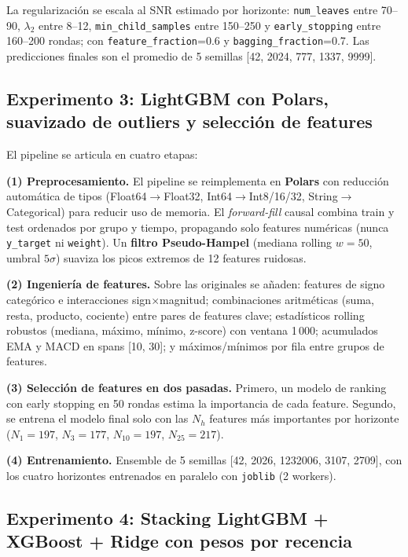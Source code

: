 \documentclass{article}
\begin{document}
La regularización se escala al SNR estimado por horizonte: \texttt{num\_leaves} entre 70--90, $\lambda_2$ entre 8--12, \texttt{min\_child\_samples} entre 150--250 y \texttt{early\_stopping} entre 160--200 rondas; con \texttt{feature\_fraction}=0.6 y \texttt{bagging\_fraction}=0.7. Las predicciones finales son el promedio de 5 semillas [42, 2024, 777, 1337, 9999].

\subsection{Experimento 3: LightGBM con Polars, suavizado de outliers y selección de features}

El pipeline se articula en cuatro etapas:

\textbf{(1) Preprocesamiento.} El pipeline se reimplementa en \textbf{Polars} con reducción automática de tipos (Float64$\to$Float32, Int64$\to$Int8/16/32, String$\to$Categorical) para reducir uso de memoria. El \emph{forward-fill} causal combina train y test ordenados por grupo y tiempo, propagando solo features numéricas (nunca \texttt{y\_target} ni \texttt{weight}). Un \textbf{filtro Pseudo-Hampel} (mediana rolling $w=50$, umbral $5\sigma$) suaviza los picos extremos de 12 features ruidosas.

\textbf{(2) Ingeniería de features.} Sobre las originales se añaden: features de signo categórico e interacciones sign$\times$magnitud; combinaciones aritméticas (suma, resta, producto, cociente) entre pares de features clave; estadísticos rolling robustos (mediana, máximo, mínimo, z-score) con ventana 1\,000; acumulados EMA y MACD en spans [10, 30]; y máximos/mínimos por fila entre grupos de features.

\textbf{(3) Selección de features en dos pasadas.} Primero, un modelo de ranking con early stopping en 50 rondas estima la importancia de cada feature. Segundo, se entrena el modelo final solo con las $N_h$ features más importantes por horizonte ($N_1=197$, $N_3=177$, $N_{10}=197$, $N_{25}=217$).

\textbf{(4) Entrenamiento.} Ensemble de 5 semillas [42, 2026, 1232006, 3107, 2709], con los cuatro horizontes entrenados en paralelo con \texttt{joblib} (2 workers).

\subsection{Experimento 4: Stacking LightGBM + XGBoost + Ridge con pesos por recencia}
\end{document}
